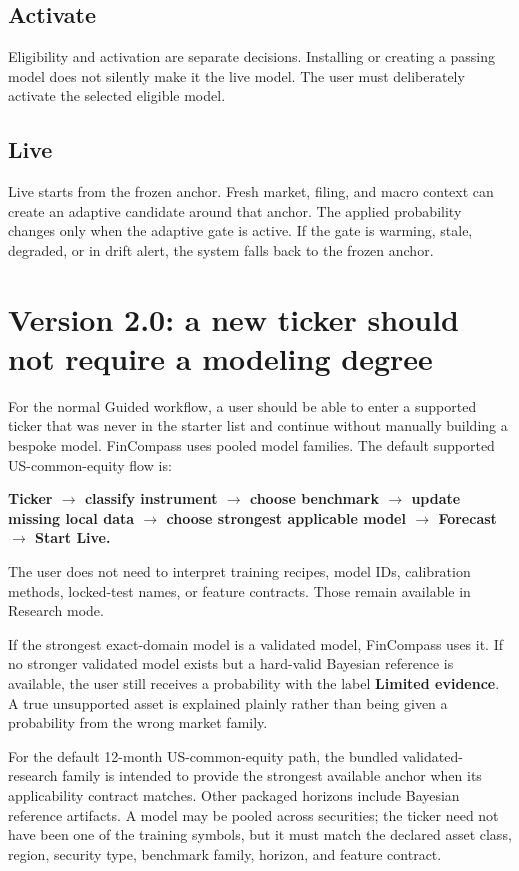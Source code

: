 \documentclass[11pt]{article}
\begin{document}
\subsection{Activate}

Eligibility and activation are separate decisions. Installing or creating a passing model does not silently make it the live model. The user must deliberately activate the selected eligible model.

\subsection{Live}

Live starts from the frozen anchor. Fresh market, filing, and macro context can create an adaptive candidate around that anchor. The applied probability changes only when the adaptive gate is active. If the gate is warming, stale, degraded, or in drift alert, the system falls back to the frozen anchor.


\section{Version 2.0: a new ticker should not require a modeling degree}
For the normal Guided workflow, a user should be able to enter a supported ticker that was never in the starter list and continue without manually building a bespoke model. FinCompass uses pooled model families. The default supported US-common-equity flow is:
\begin{center}
\textbf{Ticker $\rightarrow$ classify instrument $\rightarrow$ choose benchmark $\rightarrow$ update missing local data $\rightarrow$ choose strongest applicable model $\rightarrow$ Forecast $\rightarrow$ Start Live.}
\end{center}
The user does not need to interpret training recipes, model IDs, calibration methods, locked-test names, or feature contracts. Those remain available in Research mode.

If the strongest exact-domain model is a validated model, FinCompass uses it. If no stronger validated model exists but a hard-valid Bayesian reference is available, the user still receives a probability with the label \textbf{Limited evidence}. A true unsupported asset is explained plainly rather than being given a probability from the wrong market family.

For the default 12-month US-common-equity path, the bundled validated-research family is intended to provide the strongest available anchor when its applicability contract matches. Other packaged horizons include Bayesian reference artifacts. A model may be pooled across securities; the ticker need not have been one of the training symbols, but it must match the declared asset class, region, security type, benchmark family, horizon, and feature contract.
\end{document}

